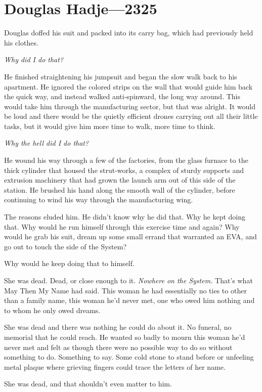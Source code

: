 \hypertarget{douglas-hadje-2325}{%
\chapter{Douglas Hadje—2325}\label{douglas-hadje-2325}}

Douglas doffed his suit and packed into its carry bag, which had previously held his clothes.

\emph{Why did I do that?}

He finished straightening his jumpsuit and began the slow walk back to his apartment. He ignored the colored strips on the wall that would guide him back the quick way, and instead walked anti-spinward, the long way around. This would take him through the manufacturing sector, but that was alright. It would be loud and there would be the quietly efficient drones carrying out all their little tasks, but it would give him more time to walk, more time to think.

\emph{Why the hell did I do that?}

He wound his way through a few of the factories, from the glass furnace to the thick cylinder that housed the strut-works, a complex of sturdy supports and extrusion machinery that had grown the launch arm out of this side of the station. He brushed his hand along the smooth wall of the cylinder, before continuing to wind his way through the manufacturing wing.

The reasons eluded him. He didn't know why he did that. Why he kept doing that. Why would he run himself through this exercise time and again? Why would he grab his suit, dream up some small errand that warranted an EVA, and go out to touch the side of the System?

Why would he keep doing that to himself.

She was dead. Dead, or close enough to it. \emph{Nowhere on the System.} That's what May Then My Name had said. This woman he had essentially no ties to other than a family name, this woman he'd never met, one who owed him nothing and to whom he only owed dreams.

She was dead and there was nothing he could do about it. No funeral, no memorial that he could reach. He wanted so badly to mourn this woman he'd never met and felt as though there were no possible way to do so without something to do. Something to say. Some cold stone to stand before or unfeeling metal plaque where grieving fingers could trace the letters of her name.

She was dead, and that shouldn't even matter to him.

